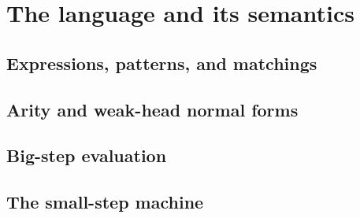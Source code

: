 \chapter{The language and its semantics}
\label{chap:semantics}


\section{Expressions, patterns, and matchings}

\section{Arity and weak-head normal forms}

\section{Big-step evaluation}

\section{The small-step machine}
